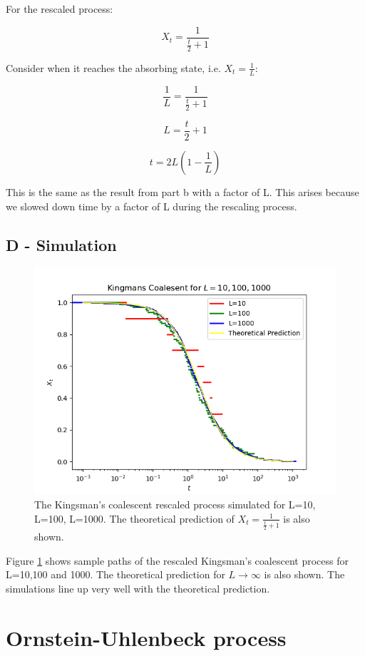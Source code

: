 \documentclass{article}
\begin{document}
For the rescaled process:

$$X_t = \frac{1}{\frac{t}{2}+1}$$

Consider when it reaches the absorbing state, i.e. $X_t = \frac{1}{L}$:

$$\frac{1}{L} = \frac{1}{\frac{t}{2}+1}$$

$$ L = \frac{t}{2}+1$$

$$ t = 2L(1-\frac{1}{L})$$


This is the same as the result from part b with a factor of L. This arises because we slowed down time by a factor of L during the rescaling process. 



\subsection{D - Simulation}

\begin{figure}[H]
\includegraphics[scale=0.8]{kingsman_a.png} 
\caption{The Kingsman's coalescent rescaled process simulated for L=10, L=100, L=1000. The theoretical prediction of $X_t = \frac{1}{\frac{t}{2} + 1}$ is also shown.}
\label{fig:kingsman}
\end{figure}

Figure \ref{fig:kingsman} shows sample paths of the rescaled Kingsman's coalescent process for L=10,100 and 1000. The theoretical prediction for $L \to \infty$ is also shown. The simulations line up very well with the theoretical prediction.


\section{Ornstein-Uhlenbeck process}
\end{document}
